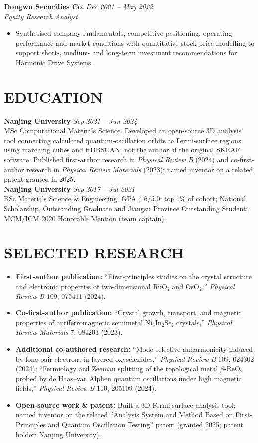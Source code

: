 \documentclass[a4paper,10pt]{article}
\begin{document}
\textbf{Dongwu Securities Co.} \hfill \textit{Dec 2021 -- May 2022}\\
\textit{Equity Research Analyst}
\begin{itemize}
\item Synthesised company fundamentals, competitive positioning, operating performance and market conditions with quantitative stock-price modelling to support short-, medium- and long-term investment recommendations for Harmonic Drive Systems.
\end{itemize}

\section{EDUCATION}
\textbf{Nanjing University} \hfill \textit{Sep 2021 -- Jun 2024}\\
MSc Computational Materials Science. Developed an open-source 3D analysis tool connecting calculated quantum-oscillation orbits to Fermi-surface regions using marching cubes and HDBSCAN; not the author of the original SKEAF software. Published first-author research in \textit{Physical Review B} (2024) and co-first-author research in \textit{Physical Review Materials} (2023); named inventor on a related patent granted in 2025.\\[2pt]
\textbf{Nanjing University} \hfill \textit{Sep 2017 -- Jul 2021}\\
BSc Materials Science \& Engineering. GPA 4.6/5.0; top 1\% of cohort; National Scholarship, Outstanding Graduate and Jiangsu Province Outstanding Student; MCM/ICM 2020 Honorable Mention (team captain).

\section{SELECTED RESEARCH}
\begin{itemize}
\item \textbf{First-author publication:} ``First-principles studies on the crystal structure and electronic properties of two-dimensional RuO$_2$ and OsO$_2$,'' \textit{Physical Review B} 109, 075411 (2024).
\item \textbf{Co-first-author publication:} ``Crystal growth, transport, and magnetic properties of antiferromagnetic semimetal Ni$_3$In$_2$Se$_2$ crystals,'' \textit{Physical Review Materials} 7, 084203 (2023).
\item \textbf{Additional co-authored research:} ``Mode-selective anharmonicity induced by lone-pair electrons in layered oxyselenides,'' \textit{Physical Review B} 109, 024302 (2024); ``Fermiology and Zeeman splitting of the topological metal $\beta$-ReO$_2$ probed by de Haas--van Alphen quantum oscillations under high magnetic fields,'' \textit{Physical Review B} 110, 205109 (2024).
\item \textbf{Open-source work \& patent:} Built a 3D Fermi-surface analysis tool; named inventor on the related ``Analysis System and Method Based on First-Principles and Quantum Oscillation Testing'' patent (granted 2025; patent holder: Nanjing University).
\end{itemize}
\end{document}
